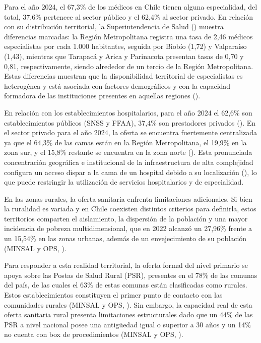 \documentclass[
  spanish,
  a4paper,
  oneside]{scrbook}
\begin{document}
Para el año 2024, el 67,3\% de los médicos en Chile tienen alguna
especialidad, del total, 37,6\% pertenece al sector público y el 62,4\%
al sector privado. En relación con su distribución territorial, la
Superintendencia de Salud
() muestra
diferencias marcadas: la Región Metropolitana registra una tasa de 2,46
médicos especialistas por cada 1.000 habitantes, seguida por Biobío
(1,72) y Valparaíso (1,43), mientras que Tarapacá y Arica y Parinacota
presentan tasas de 0,70 y 0,81, respectivamente, siendo alrededor de un
tercio de la Región Metropolitana. Estas diferencias muestran que la
disponibilidad territorial de especialistas es heterogénea y está
asociada con factores demográficos y con la capacidad formadora de las
instituciones presentes en aquellas regiones
().

En relación con los establecimientos hospitalarios, para el año 2024 el
62,6\% son establecimientos públicos (SNSS y FFAA), 37,4\% son
prestadores privados
(). En el sector privado para el año 2024, la oferta se encuentra
fuertemente centralizada ya que el 64,3\% de las camas están en la
Región Metropolitana, el 19,9\% en la zona sur, y el 15,8\% restante se
encuentra en la zona norte
(). Esta pronunciada concentración geográfica e institucional de la
infraestructura de alta complejidad configura un acceso dispar a la cama
de un hospital debido a su localización
(), lo
que puede restringir la utilización de servicios hospitalarios y de
especialidad.

En las zonas rurales, la oferta sanitaria enfrenta limitaciones
adicionales. Si bien la ruralidad es variada y en Chile coexisten
distintos criterios para definirla, estos territorios comparten el
aislamiento, la dispersión de la población y una mayor incidencia de
pobreza multidimensional, que en 2022 alcanzó un 27,96\% frente a un
15,54\% en las zonas urbanas, además de un envejecimiento de su
población (MINSAL y OPS,
).

Para responder a esta realidad territorial, la oferta formal del nivel
primario se apoya sobre las Postas de Salud Rural (PSR), presentes en el
78\% de las comunas del país, de las cuales el 63\% de estas comunas
están clasificadas como rurales. Estos establecimientos constituyen el
primer punto de contacto con las comunidades rurales (MINSAL y OPS,
). Sin embargo, la
capacidad real de esta oferta sanitaria rural presenta limitaciones
estructurales dado que un 44\% de las PSR a nivel nacional posee una
antigüedad igual o superior a 30 años y un 14\% no cuenta con box de
procedimientos (MINSAL y OPS,
).
\end{document}
